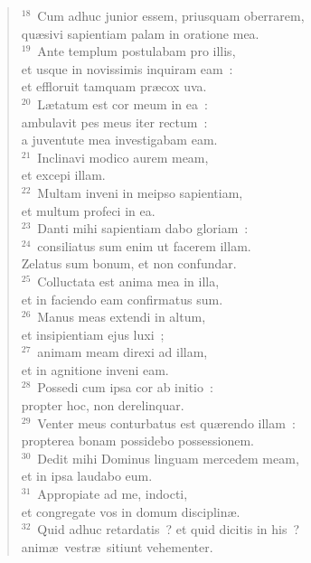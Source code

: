 \begin{flushleft}\begin{verse}${}^{18}$~Cum adhuc junior essem, priusquam oberrarem,\\ qu\ae sivi sapientiam palam in oratione mea.\\
${}^{19}$~Ante templum postulabam pro illis,\\ et usque in novissimis inquiram eam~:\\ et effloruit tamquam pr\ae cox uva.\\
${}^{20}$~L\ae tatum est cor meum in ea~:\\ ambulavit pes meus iter rectum~:\\ a juventute mea investigabam eam.\\
${}^{21}$~Inclinavi modico aurem meam,\\ et excepi illam.\\
${}^{22}$~Multam inveni in meipso sapientiam,\\ et multum profeci in ea.\\
${}^{23}$~Danti mihi sapientiam dabo gloriam~:\\
${}^{24}$~consiliatus sum enim ut facerem illam.\\ Zelatus sum bonum, et non confundar.\\
${}^{25}$~Colluctata est anima mea in illa,\\ et in faciendo eam confirmatus sum.\\
${}^{26}$~Manus meas extendi in altum,\\ et insipientiam ejus luxi~;\\
${}^{27}$~animam meam direxi ad illam,\\ et in agnitione inveni eam.\\
${}^{28}$~Possedi cum ipsa cor ab initio~:\\ propter hoc, non derelinquar.\\
${}^{29}$~Venter meus conturbatus est qu\ae rendo illam~:\\ propterea bonam possidebo possessionem.\\
${}^{30}$~Dedit mihi Dominus linguam mercedem meam,\\ et in ipsa laudabo eum.\\
${}^{31}$~Appropiate ad me, indocti,\\ et congregate vos in domum disciplin\ae .\\
${}^{32}$~Quid adhuc retardatis~? et quid dicitis in his~?\\ anim\ae\ vestr\ae\ sitiunt vehementer.\\

\end{verse}
\end{flushleft}
